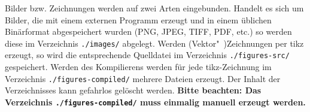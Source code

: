 Bilder bzw. Zeichnungen werden auf zwei
Arten eingebunden. Handelt es sich um Bilder, die mit einem externen Programm
erzeugt und in einem üblichen Binärformat abgespeichert
wurden (PNG, JPEG, TIFF, PDF, etc.) so werden diese im
Verzeichnis \texttt{./images/} abgelegt. Werden (Vektor"~)Zeichnungen per
\gls{tikz} erzeugt, so wird die entsprechende Quelldatei im Verzeichnis
\texttt{./figures-src/} gespeichert. Werden des Kompilierens werden für jede
\gls{tikz}-Zeichnung im Verzeichnis \texttt{./figures-compiled/} mehrere
Dateien erzeugt. Der Inhalt der Verzeichnisses kann gefahrlos gelöscht werden.
\textbf{Bitte beachten: Das Verzeichnis \texttt{./figures-compiled/} muss einmalig manuell erzeugt werden.}

